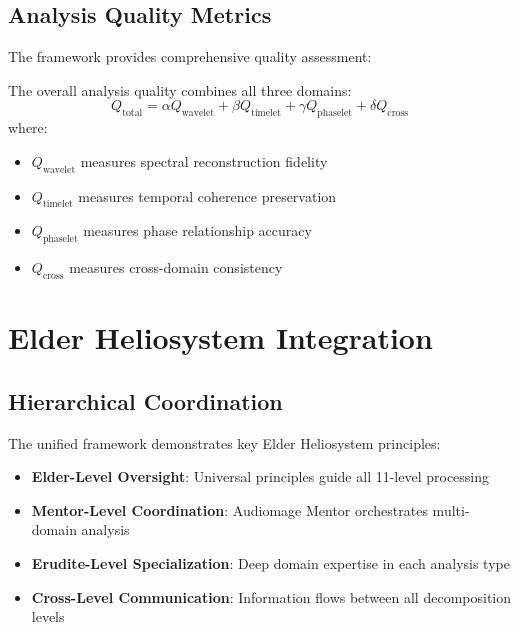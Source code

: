 \subsection{Analysis Quality Metrics}

The framework provides comprehensive quality assessment:

\begin{definition}
The overall analysis quality combines all three domains:
\begin{equation}
Q_{\text{total}} = \alpha Q_{\text{wavelet}} + \beta Q_{\text{timelet}} + \gamma Q_{\text{phaselet}} + \delta Q_{\text{cross}}
\end{equation}
where:
\begin{itemize}
    \item $Q_{\text{wavelet}}$ measures spectral reconstruction fidelity
    \item $Q_{\text{timelet}}$ measures temporal coherence preservation
    \item $Q_{\text{phaselet}}$ measures phase relationship accuracy
    \item $Q_{\text{cross}}$ measures cross-domain consistency
\end{itemize}
\end{definition}

\section{Elder Heliosystem Integration}

\subsection{Hierarchical Coordination}

The unified framework demonstrates key Elder Heliosystem principles:

\begin{itemize}
    \item \textbf{Elder-Level Oversight}: Universal principles guide all 11-level processing
    \item \textbf{Mentor-Level Coordination}: Audiomage Mentor orchestrates multi-domain analysis
    \item \textbf{Erudite-Level Specialization}: Deep domain expertise in each analysis type
    \item \textbf{Cross-Level Communication}: Information flows between all decomposition levels
\end{itemize}

